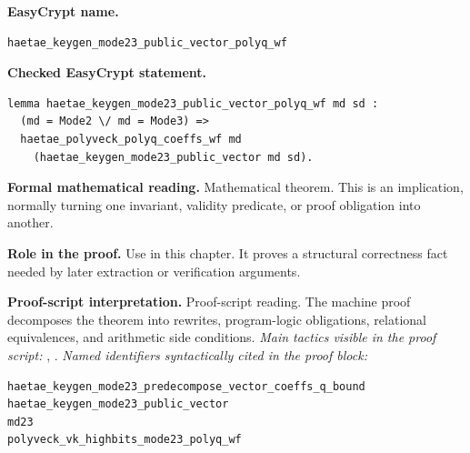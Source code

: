 \begin{formaltheorem}
\noindent\textbf{EasyCrypt name.}
\begin{lstlisting}[language=EasyCrypt,basicstyle=\ttfamily\scriptsize]
haetae_keygen_mode23_public_vector_polyq_wf
\end{lstlisting}
\noindent\textbf{Checked EasyCrypt statement.}
\begin{lstlisting}[language=EasyCrypt,basicstyle=\ttfamily\scriptsize]
lemma haetae_keygen_mode23_public_vector_polyq_wf md sd :
  (md = Mode2 \/ md = Mode3) =>
  haetae_polyveck_polyq_coeffs_wf md
    (haetae_keygen_mode23_public_vector md sd).
\end{lstlisting}
\noindent\textbf{Formal mathematical reading.}
Mathematical theorem. This is an implication, normally turning one invariant, validity predicate, or proof obligation into another.

\noindent\textbf{Role in the proof.}
Use in this chapter. It proves a structural correctness fact needed by later extraction or verification arguments.

\noindent\textbf{Proof-script interpretation.}
Proof-script reading. The machine proof decomposes the theorem into rewrites, program-logic obligations, relational equivalences, and arithmetic side conditions.
\emph{Main tactics visible in the proof script:} , .
\emph{Named identifiers syntactically cited in the proof block:}
\begin{lstlisting}[language=EasyCrypt,basicstyle=\ttfamily\scriptsize]
haetae_keygen_mode23_predecompose_vector_coeffs_q_bound
haetae_keygen_mode23_public_vector
md23
polyveck_vk_highbits_mode23_polyq_wf
\end{lstlisting}

\end{formaltheorem}

